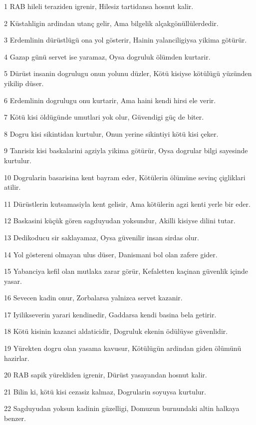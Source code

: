 \par 1 RAB hileli teraziden igrenir, Hilesiz tartidansa hosnut kalir.
\par 2 Küstahligin ardindan utanç gelir, Ama bilgelik alçakgönüllülerdedir.
\par 3 Erdemlinin dürüstlügü ona yol gösterir, Hainin yalanciligiysa yikima götürür.
\par 4 Gazap günü servet ise yaramaz, Oysa dogruluk ölümden kurtarir.
\par 5 Dürüst insanin dogrulugu onun yolunu düzler, Kötü kisiyse kötülügü yüzünden yikilip düser.
\par 6 Erdemlinin dogrulugu onu kurtarir, Ama haini kendi hirsi ele verir.
\par 7 Kötü kisi öldügünde umutlari yok olur, Güvendigi güç de biter.
\par 8 Dogru kisi sikintidan kurtulur, Onun yerine sikintiyi kötü kisi çeker.
\par 9 Tanrisiz kisi baskalarini agziyla yikima götürür, Oysa dogrular bilgi sayesinde kurtulur.
\par 10 Dogrularin basarisina kent bayram eder, Kötülerin ölümüne sevinç çigliklari atilir.
\par 11 Dürüstlerin kutsamasiyla kent gelisir, Ama kötülerin agzi kenti yerle bir eder.
\par 12 Baskasini küçük gören sagduyudan yoksundur, Akilli kisiyse dilini tutar.
\par 13 Dedikoducu sir saklayamaz, Oysa güvenilir insan sirdas olur.
\par 14 Yol göstereni olmayan ulus düser, Danismani bol olan zafere gider.
\par 15 Yabanciya kefil olan mutlaka zarar görür, Kefaletten kaçinan güvenlik içinde yasar.
\par 16 Sevecen kadin onur, Zorbalarsa yalnizca servet kazanir.
\par 17 Iyilikseverin yarari kendinedir, Gaddarsa kendi basina bela getirir.
\par 18 Kötü kisinin kazanci aldaticidir, Dogruluk ekenin ödülüyse güvenlidir.
\par 19 Yürekten dogru olan yasama kavusur, Kötülügün ardindan giden ölümünü hazirlar.
\par 20 RAB sapik yürekliden igrenir, Dürüst yasayandan hosnut kalir.
\par 21 Bilin ki, kötü kisi cezasiz kalmaz, Dogrularin soyuysa kurtulur.
\par 22 Sagduyudan yoksun kadinin güzelligi, Domuzun burnundaki altin halkaya benzer.

